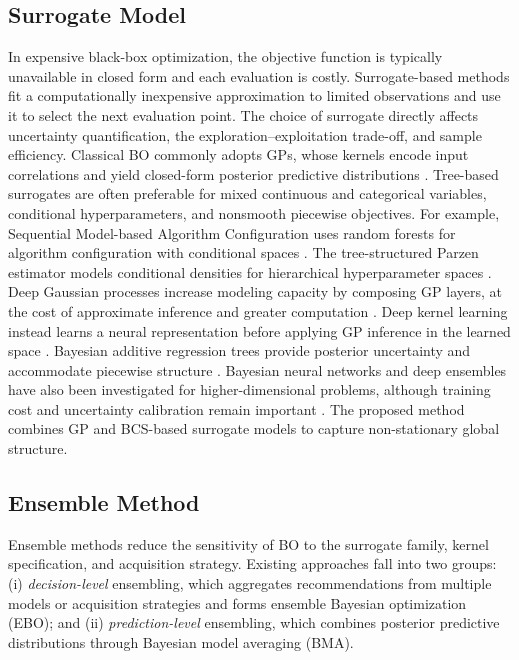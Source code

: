 \documentclass[lettersize,journal]{IEEEtran}
\begin{document}
\subsection{Surrogate Model}
In expensive black-box optimization, the objective function is typically unavailable in closed form and each evaluation is costly. Surrogate-based methods fit a computationally inexpensive approximation to limited observations and use it to select the next evaluation point. The choice of surrogate directly affects uncertainty quantification, the exploration--exploitation trade-off, and sample efficiency. Classical BO commonly adopts GPs, whose kernels encode input correlations and yield closed-form posterior predictive distributions \cite{RasmussenWilliams2006GPML,Shahriari2016ReviewBO,Frazier2018TutorialBO}. Tree-based surrogates are often preferable for mixed continuous and categorical variables, conditional hyperparameters, and nonsmooth piecewise objectives. For example, Sequential Model-based Algorithm Configuration uses random forests for algorithm configuration with conditional spaces \cite{Hutter2011SMAC}. The tree-structured Parzen estimator models conditional densities for hierarchical hyperparameter spaces \cite{bergstra2011algorithms}. Deep Gaussian processes increase modeling capacity by composing GP layers, at the cost of approximate inference and greater computation \cite{DamianouLawrence2013DeepGP,SalimbeniDeisenroth2017DSVI}. Deep kernel learning instead learns a neural representation before applying GP inference in the learned space \cite{Wilson2016DKL}. Bayesian additive regression trees provide posterior uncertainty and accommodate piecewise structure \cite{Chipman2010BART}. Bayesian neural networks and deep ensembles have also been investigated for higher-dimensional problems, although training cost and uncertainty calibration remain important \cite{Blundell2015WeightUncertainty,Lakshminarayanan2017DeepEnsembles}. The proposed method combines GP and BCS-based surrogate models to capture non-stationary global structure.

\subsection{Ensemble Method}
Ensemble methods reduce the sensitivity of BO to the surrogate family, kernel specification, and acquisition strategy. Existing approaches fall into two groups: (i) \emph{decision-level} ensembling, which aggregates recommendations from multiple models or acquisition strategies and forms ensemble Bayesian optimization (EBO); and (ii) \emph{prediction-level} ensembling, which combines posterior predictive distributions through Bayesian model averaging (BMA).
\end{document}
